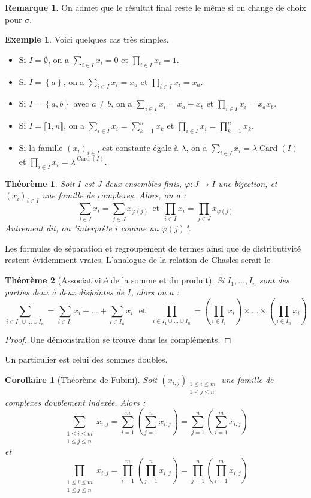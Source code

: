 \documentclass[french]{book}
\theoremstyle{plain}
\newtheorem{thm}{Théorème}[chapter]
\newtheorem{cor}{Corollaire}[chapter]
\theoremstyle{definition}
\newtheorem{exa}{Exemple}[chapter]
\newtheorem{rmq}{Remarque}[chapter]
\theoremstyle{remark}
\DeclareMathOperator{\card}{Card}
\begin{document}
\begin{rmq}
	On admet que le résultat final reste le même si on change de choix pour $\sigma$.
\end{rmq}
\begin{exa}
	Voici quelques cas très simples.
	\begin{itemize}
		\item Si $I=\emptyset$, on a $\displaystyle \sum_{i\in I}x_i=0$ et $\displaystyle \prod_{i\in I}x_i=1$.
		\item Si $I=\left\{a\right\}$, on a $\displaystyle \sum_{i\in I}x_i=x_a$ et $\displaystyle \prod_{i\in I}x_i=x_a$.
		\item Si $I=\left\{a,b\right\}$ avec $a\ne b$, on a $\displaystyle \sum_{i\in I}x_i=x_a+x_b$ et $\displaystyle \prod_{i\in I}x_i=x_a x_b$.
		\item Si $I=\llbracket1,n\rrbracket$, on a $\displaystyle \sum_{i\in I}x_i=\sum_{k=1}^{n}x_k$ et $\displaystyle \prod_{i\in I}x_i=\prod_{k=1}^{n}x_k$.
		\item Si la famille $(x_i)_{i\in I}$ est constante égale à $\lambda$, on a $\displaystyle \sum_{i\in I}x_i=\lambda\card(I)$ et $\displaystyle \prod_{i\in I}x_i=\lambda^{\card(I)}$.
	\end{itemize}
\end{exa}
\begin{thm}
	Soit $I$ est $J$ deux ensembles finis, $\varphi:J\rightarrow I$ une bijection, et $(x_i)_{i\in I}$ une famille de complexes. Alors, on a : $$\sum_{i\in I}x_i=\sum_{j\in J} x_{\varphi(j)} \ \ \text{et} \ \ \prod_{i\in I}x_i=\prod_{j\in J} x_{\varphi(j)}$$ Autrement dit, on "interprète $i$ comme un $\varphi(j)$".
\end{thm}
Les formules de séparation et regroupement de termes ainsi que de distributivité restent évidemment vraies. L'analogue de la relation de Chasles serait le 
\begin{thm}[Associativité de la somme et du produit]
	Si $I_1,\ldots,I_n$ sont des parties deux à deux disjointes de $I$, alors on a : $$\sum_{i\in I_1\cup\ldots\cup I_n}=\sum_{i\in I_1}x_i +\ldots+\sum_{i\in I_n}x_i \ \ \ \text{et} \ \ \ \prod_{i\in I_1\cup\ldots\cup I_n}=\left(\prod_{i\in I_1}x_i\right)\times\ldots\times\left(\prod_{i\in I_n}x_i\right)$$
\end{thm}
\begin{proof}
	Une démonstration se trouve dans les compléments.
\end{proof}
Un particulier est celui des sommes doubles.
\begin{cor}[Théorème de Fubini]
	Soit $\displaystyle\left(x_{i,j}\right)_{\substack{1\leqslant i\leqslant m \\ 1\leqslant j\leqslant n}}$ une famille de complexes doublement indexée. Alors : $$\sum_{\substack{1\leqslant i\leqslant m \\ 1\leqslant j\leqslant n}}x_{i,j}=\sum_{i=1}^{m}\left(\sum_{j=1}^{n}x_{i,j}\right)=\sum_{j=1}^{n}\left(\sum_{i=1}^{m}x_{i,j}\right)$$ et $$\prod_{\substack{1\leqslant i\leqslant m \\ 1\leqslant j\leqslant n}}x_{i,j}=\prod_{i=1}^{m}\left(\prod_{j=1}^{n}x_{i,j}\right)=\prod_{j=1}^{n}\left(\prod_{i=1}^{m}x_{i,j}\right)$$
\end{cor}
\end{document}
